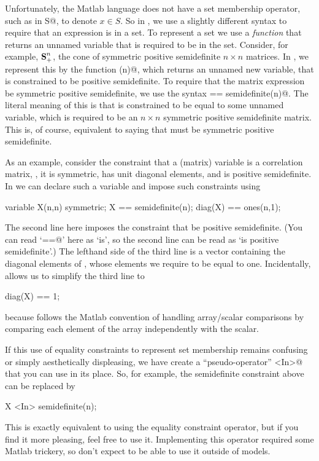 \documentclass[12pt]{article}
\newcommand{\symm}{{\mbox{\bf S}}}  %
\begin{document}
Unfortunately, the Matlab language does not have a 
set membership operator, such as \verb@x in S@, to denote $x \in S$.  
So in \cvx, we use a slightly different syntax to require
that an expression is in a set.
To represent a set we use a \emph{function} that returns
an unnamed variable that is required to be in the set.
Consider, for example, $\symm^n_+$, the cone of 
symmetric positive semidefinite $n \times n$ matrices.
In \cvx, we represent this by the function \verb@semidefinite(n)@,
which returns an unnamed new variable, that is constrained to be
positive semidefinite.
To require that the matrix expression \verb@X@ 
be symmetric positive semidefinite, we use the syntax \verb@X == semidefinite(n)@.
The literal meaning of this is that \verb@X@ is constrained to be 
equal to some unnamed variable, which is required to be 
an $n \times n$ symmetric positive semidefinite matrix. 
This is, of course, equivalent to saying that \verb@X@ must be
symmetric positive semidefinite.

As an example, consider the constraint
that a (matrix) variable \verb@X@ is a correlation
matrix, \ie, it is symmetric, has unit diagonal elements, and 
is positive semidefinite.  In \cvx we can declare such a variable
and impose such constraints using
\begin{code}
	variable X(n,n) symmetric;
	X == semidefinite(n);
	diag(X) == ones(n,1);
\end{code}
The second line here imposes the constraint that \verb@X@
be positive semidefinite.
(You can read `\verb@==@' here as `is', so the second line can be 
read as `\verb@X@ is positive semidefinite'.)
The lefthand side of the third line
is a vector containing the diagonal elements of \verb@X@, whose 
elements we require to be equal to one. Incidentally, \cvx
allows us to simplify the third line to
\begin{code}
	diag(X) == 1;
\end{code}
because \cvx follows the Matlab convention of handling array/scalar
comparisons by comparing each element of the array independently with the scalar.

If this use of equality constraints to
represent set membership remains confusing or simply aesthetically
displeasing, we have create a ``pseudo-operator'' \verb@<In>@ that
you can use in its place. So, for example, the semidefinite constraint
above can be replaced by
\begin{code}
	X <In> semidefinite(n);
\end{code}
This is exactly equivalent to using the equality constraint operator,
but if you find it more pleasing, feel free to use it. Implementing this
operator required some Matlab trickery, so don't expect to be able to
use it outside of \cvx models.
\end{document}
